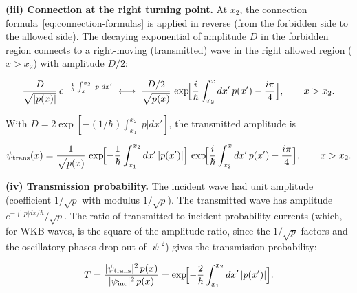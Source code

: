 \medskip\noindent\textbf{(iii) Connection at the right turning point.} At $x_2$, the connection formula~\eqref{eq:connection-formulas} is applied in reverse (from the forbidden side to the allowed side). The decaying exponential of amplitude $D$ in the forbidden region connects to a right-moving (transmitted) wave in the right allowed region ($x > x_2$) with amplitude $D/2$:
\begin{linenomath}
\begin{equation*}
\frac{D}{\sqrt{|p(x)|}}\,e^{-\frac{1}{\hbar}\int_x^{x_2}|p|dx'}
\;\longleftrightarrow\;
\frac{D/2}{\sqrt{p(x)}}\,
\exp\!\Bigl[\frac{i}{\hbar}\int_{x_2}^x dx'\,p(x') - \frac{i\pi}{4}\Bigr], \qquad x > x_2 .
\end{equation*}
\end{linenomath}
With $D = 2\exp[-(1/\hbar)\int_{x_1}^{x_2}|p|dx']$, the transmitted amplitude is
\begin{linenomath}
\begin{equation*}
\psi_{\text{trans}}(x) = \frac{1}{\sqrt{p(x)}}\,
\exp\!\Bigl[-\frac{1}{\hbar}\int_{x_1}^{x_2} dx'\,|p(x')|\Bigr]\,
\exp\!\Bigl[\frac{i}{\hbar}\int_{x_2}^x dx'\,p(x') - \frac{i\pi}{4}\Bigr], \qquad x > x_2 .
\end{equation*}
\end{linenomath}

\medskip\noindent\textbf{(iv) Transmission probability.} The incident wave had unit amplitude (coefficient $1/\sqrt{p}$ with modulus $1/\sqrt{p}$). The transmitted wave has amplitude $e^{-\int |p|dx/\hbar}/\sqrt{p}$. The ratio of transmitted to incident probability currents (which, for WKB waves, is the square of the amplitude ratio, since the $1/\sqrt{p}$ factors and the oscillatory phases drop out of $|\psi|^2$) gives the transmission probability:
\begin{linenomath}
\begin{equation}
T = \frac{|\psi_{\text{trans}}|^2\,p(x)}{|\psi_{\text{inc}}|^2\,p(x)}
= \exp\!\Bigl[-\frac{2}{\hbar}\int_{x_1}^{x_2} dx'\,|p(x')|\Bigr] .
\end{equation}
\end{linenomath}

